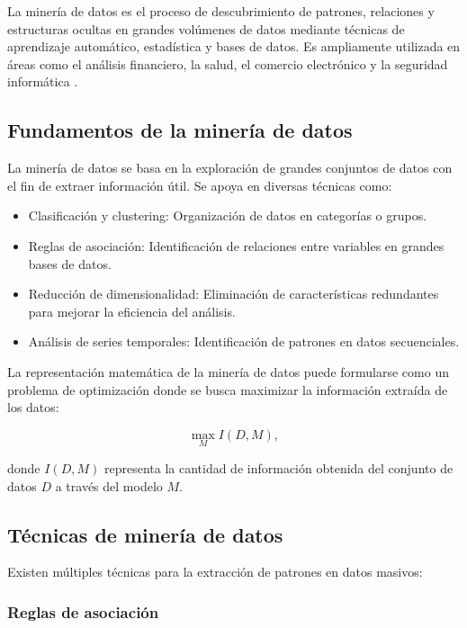 \begin{itemize}
		La minería de datos es el proceso de descubrimiento de patrones, relaciones y estructuras ocultas en grandes volúmenes de datos mediante técnicas de aprendizaje automático, estadística y bases de datos. Es ampliamente utilizada en áreas como el análisis financiero, la salud, el comercio electrónico y la seguridad informática \cite{han2011data}.
		
		\subsection{Fundamentos de la minería de datos}
		
		La minería de datos se basa en la exploración de grandes conjuntos de datos con el fin de extraer información útil. Se apoya en diversas técnicas como:
		
		\begin{itemize}
			\item Clasificación y clustering: Organización de datos en categorías o grupos.
			\item Reglas de asociación: Identificación de relaciones entre variables en grandes bases de datos.
			\item Reducción de dimensionalidad: Eliminación de características redundantes para mejorar la eficiencia del análisis.
			\item Análisis de series temporales: Identificación de patrones en datos secuenciales.
		\end{itemize}
		
		La representación matemática de la minería de datos puede formularse como un problema de optimización donde se busca maximizar la información extraída de los datos:
		
		\begin{equation}
			\max_{M} I(D, M),
		\end{equation}
		
		donde \( I(D, M) \) representa la cantidad de información obtenida del conjunto de datos \( D \) a través del modelo \( M \).
		
		\subsection{Técnicas de minería de datos}
		
		Existen múltiples técnicas para la extracción de patrones en datos masivos:
		
		\subsubsection{Reglas de asociación}
		

\end{itemize}
